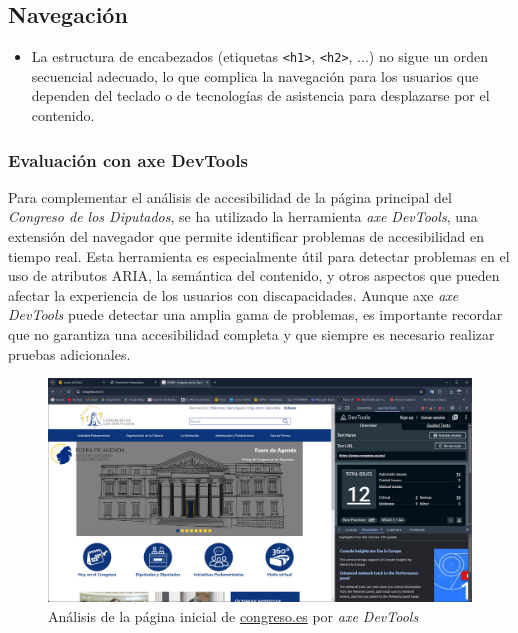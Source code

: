 \documentclass[]{article}
\begin{document}
\subsection*{Navegación}
\begin{itemize}
	\item La estructura de encabezados (etiquetas \texttt{<h1>}, \texttt{<h2>}, ...) no sigue un orden secuencial adecuado, lo que complica la navegación para los usuarios que dependen del teclado o de tecnologías de asistencia para desplazarse por el contenido.
\end{itemize}

\subsubsection{Evaluación con axe DevTools}

Para complementar el análisis de accesibilidad de la página principal del \textit{Congreso de los Diputados}, se ha utilizado la herramienta \textit{axe DevTools}, una extensión del navegador que permite identificar problemas de accesibilidad en tiempo real. Esta herramienta es especialmente útil para detectar problemas en el uso de atributos ARIA, la semántica del contenido, y otros aspectos que pueden afectar la experiencia de los usuarios con discapacidades. Aunque axe \textit{axe DevTools} puede detectar una amplia gama de problemas, es importante recordar que no garantiza una accesibilidad completa y que siempre es necesario realizar pruebas adicionales.

\begin{figure}[h]
	\centering
	\includegraphics[width=\textwidth]{Capturas/3.png}
	\caption{Análisis de la página inicial de \href{https://www.congreso.es/es/home}{congreso.es} por \textit{axe DevTools}}
	\label{fig:etiqueta}
\end{figure}
\end{document}
